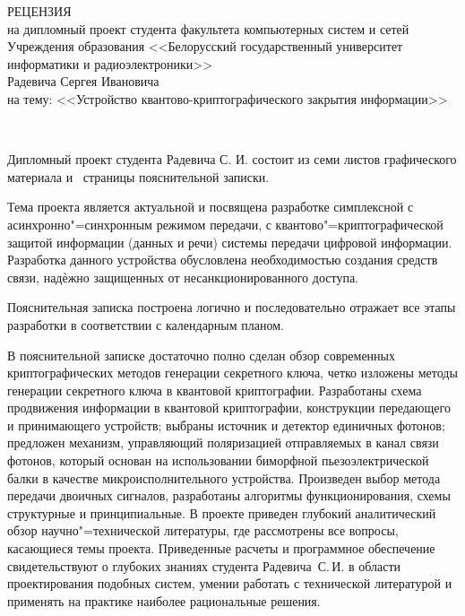 
\thispagestyle{empty}

\begin{singlespace}

{\small
  \begin{center}
    \begin{minipage}{0.9\textwidth}
      \begin{center}
        {\normalsize РЕЦЕНЗИЯ}\\[0.2cm]
        на дипломный проект студента факультета компьютерных систем и сетей Учреждения образования <<Белорусский государственный университет информатики и радиоэлектроники>>\\
        Радевича Сергея Ивановича \\
        на тему: <<Устройство квантово-криптографического закрытия информации>>
      \end{center}
    \end{minipage}\\
  \end{center}

Дипломный проект студента Радевича С. И. состоит из семи листов графического материала и~\pageref*{LastPage} страницы пояснительной записки.

Тема проекта является актуальной и посвящена разработке симплексной с асинхронно"=синхронным режимом передачи, с квантово"=криптографической защитой информации (данных и речи) системы передачи цифровой информации. 
Разработка данного устройства обусловлена необходимостью создания средств связи, надѐжно защищенных от несанкционированного доступа.

Пояснительная записка построена логично и последовательно отражает все этапы разработки в соответствии с календарным планом.

В пояснительной записке достаточно полно сделан обзор современных криптографических методов генерации секретного ключа, четко изложены методы генерации секретного
ключа в квантовой криптографии.
Разработаны схема продвижения информации в квантовой криптографии, конструкции передающего и принимающего устройств; выбраны источник и детектор единичных фотонов; предложен механизм, управляющий поляризацией отправляемых в канал связи фотонов, который основан на использовании биморфной пьезоэлектрической балки в качестве микроисполнительного устройства. 
Произведен выбор метода передачи двоичных сигналов, разработаны алгоритмы функционирования, схемы структурные и принципиальные.
В проекте приведен глубокий аналитический обзор научно"=технической литературы, где рассмотрены все вопросы, касающиеся темы проекта.
Приведенные расчеты и программное обеспечение свидетельствуют о глубоких знаниях студента Радевича~С.\,И. в области проектирования подобных систем, умении работать с технической литературой и применять на практике наиболее рациональные решения.

}
\end{singlespace}
